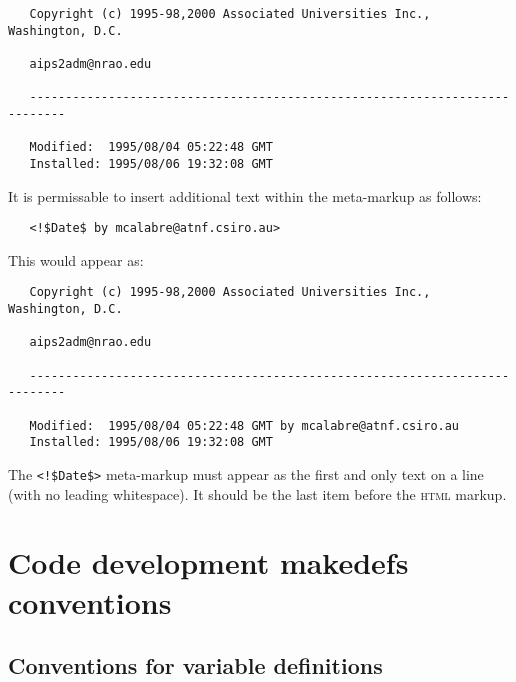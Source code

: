 \begin{verbatim}
   Copyright (c) 1995-98,2000 Associated Universities Inc., Washington, D.C.

   aips2adm@nrao.edu

   ---------------------------------------------------------------------------

   Modified:  1995/08/04 05:22:48 GMT
   Installed: 1995/08/06 19:32:08 GMT
\end{verbatim}

\noindent
It is permissable to insert additional text within the meta-markup as follows:

\noindent
\verb+   <!$+\verb+Date$ by mcalabre@atnf.csiro.au>+

\noindent
This would appear as:

\begin{verbatim}
   Copyright (c) 1995-98,2000 Associated Universities Inc., Washington, D.C.

   aips2adm@nrao.edu

   ---------------------------------------------------------------------------

   Modified:  1995/08/04 05:22:48 GMT by mcalabre@atnf.csiro.au
   Installed: 1995/08/06 19:32:08 GMT
\end{verbatim}

\noindent
The \verb+<!$+\verb+Date$>+ meta-markup must appear as the first and only text
on a line (with no leading whitespace).  It should be the last item before the
 \textsc{html} markup.


\newpage
\section{Code development makedefs conventions}
\label{Code development makedefs conventions}

\subsection*{Conventions for  variable definitions}

